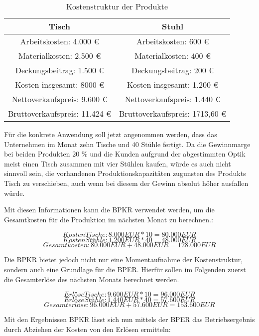 \begin{table}[h]
    \centering
    \label{tab:Kostenstruktur_Produkte}
    \begin{tabular}{|c|c|}
      \hline
      Tisch & Stuhl \\
      \hline
      Arbeitskosten: 4.000 {\euro} & Arbeitskosten: 600 {\euro} \\
      Materialkosten: 2.500 {\euro} & Materialkosten: 400 {\euro} \\
      Deckungsbeitrag: 1.500 {\euro} & Deckungsbeitrag: 200 {\euro} \\ 
      \hline
      Kosten insgesamt: 8000 {\euro} & Kosten insgesamt: 1.200 {\euro} \\
      \hline
      Nettoverkaufspreis: 9.600 {\euro} & Nettoverkaufspreis: 1.440 {\euro} \\
      \hline
      Bruttoverkaufspreis: 11.424 {\euro} & Bruttoverkaufspreis: 1713,60 {\euro} \\
      \hline
    \end{tabular}
    \caption{Kostenstruktur der Produkte}
  \end{table}

Für die konkrete Anwendung soll jetzt angenommen werden, dass das Unternehmen im Monat zehn Tische und 40 Stühle fertigt. Da die Gewinnmarge bei beiden Produkten 20 \% und die Kunden aufgrund der abgestimmten Optik meist einen Tisch zusammen mit vier Stühlen kaufen, würde es auch nicht sinnvoll sein, die vorhandenen Produktionskapazitäten zugunsten des Produkts Tisch zu verschieben, auch wenn bei diesem der Gewinn absolut höher ausfallen würde.

Mit diesen Informationen kann die BPKR verwendet werden, um die Gesamtkosten für die Produktion im nächsten Monat zu berechnen.:

\[ Kosten Tische: 8.000 EUR * 10 = 80.000 EUR \]
\[ Kosten Stühle: 1.200 EUR * 40 = 48.000 EUR \]
\[ Gesamtkosten: 80.000 EUR + 48.000 EUR = 128.000 EUR \]

Die BPKR bietet jedoch nicht nur eine Momentaufnahme der Kostenstruktur, sondern auch eine Grundlage für die BPER. Hierfür sollen im Folgenden zuerst die Gesamterlöse des nächsten Monats berechnet werden.

\[ Erlöse Tische: 9.600 EUR * 10 = 96.000 EUR \]
\[ Erlöse Stühle: 1.440 EUR * 40 = 57.600 EUR \]
\[ Gesamterlöse: 96.000 EUR + 57.600 EUR = 153.600 EUR \]

Mit den Ergebnissen BPKR lässt sich nun mittels der BPER das Betriebsergebnis durch Abziehen der Kosten von den Erlösen ermitteln:

